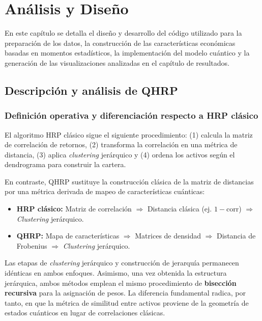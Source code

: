 \chapter{Análisis y Diseño}
\label{cap:analisis_diseno}

En este capítulo se detalla el diseño y desarrollo del código utilizado para la preparación de los datos, la construcción de las características económicas basadas en momentos estadísticos, la implementación del modelo cuántico y la generación de las visualizaciones analizadas en el capítulo de resultados.


\section{Descripción y análisis de QHRP}
\label{sec:descripcion_analisis_qhrp}

\subsection{Definición operativa y diferenciación respecto a HRP clásico}
\label{subsec:qhrp_vs_hrp}

El algoritmo \gls{HRP} clásico sigue el siguiente procedimiento: (1) calcula la matriz de correlación de retornos, (2) transforma la correlación en una métrica de distancia, (3) aplica \textit{clustering} jerárquico y (4) ordena los activos según el dendrograma para construir la cartera.

En contraste, \gls{QHRP} sustituye la construcción clásica de la matriz de distancias por una métrica derivada de mapeo de características cuánticas:
\begin{itemize}
    \item \textbf{\gls{HRP} clásico:} Matriz de correlación $\Rightarrow$ Distancia clásica (ej. $1 - \text{corr}$) $\Rightarrow$ \textit{Clustering} jerárquico.
    \item \textbf{\gls{QHRP}:} Mapa de características $\Rightarrow$ Matrices de densidad $\Rightarrow$ Distancia de Frobenius $\Rightarrow$ \textit{Clustering} jerárquico.
\end{itemize}

Las etapas de \textit{clustering} jerárquico y construcción de jerarquía permanecen idénticas en ambos enfoques. Asimismo, una vez obtenida la estructura jerárquica, ambos métodos emplean el mismo procedimiento de \textbf{bisección recursiva} para la asignación de pesos. La diferencia fundamental radica, por tanto, en que la métrica de similitud entre activos proviene de la geometría de estados cuánticos en lugar de correlaciones clásicas.

